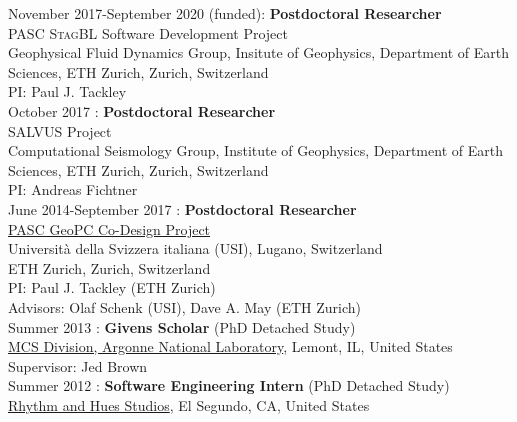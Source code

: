 
\noindent November 2017-September 2020 (funded): \textbf{Postdoctoral Researcher} \\
PASC \textsc{StagBL} Software Development Project \\
Geophysical Fluid Dynamics Group, Insitute of Geophysics, Department of Earth Sciences, ETH Zurich, Zurich, Switzerland \\
PI: Paul J. Tackley \\

\noindent October 2017 : \textbf{Postdoctoral Researcher}\\
\textsc{SALVUS} Project\\
Computational Seismology Group, Institute of Geophysics, Department of Earth Sciences, ETH Zurich, Zurich, Switzerland \\
PI: Andreas Fichtner \\

\noindent June 2014-September 2017 : \textbf{Postdoctoral Researcher} \\
\href{http://www.pasc-ch.org/projects/projects/geopc/}{PASC GeoPC Co-Design Project} \\
Universit\`{a} della Svizzera italiana (USI), Lugano, Switzerland \\
ETH Zurich, Zurich, Switzerland \\
PI: Paul J. Tackley (ETH Zurich) \\
Advisors: Olaf Schenk (USI), Dave A. May (ETH Zurich) \\


\noindent Summer 2013 : \textbf{Givens Scholar} (PhD Detached Study) \\
\href{http://www.mcs.anl.gov}{MCS Division, Argonne National Laboratory}, Lemont, IL, United States \\
Supervisor: Jed Brown \\


\noindent Summer 2012 : \textbf{Software Engineering Intern} (PhD Detached Study)\\
\href{http://www.rhythm.com}{Rhythm and Hues Studios},
El Segundo, CA, United States \\


